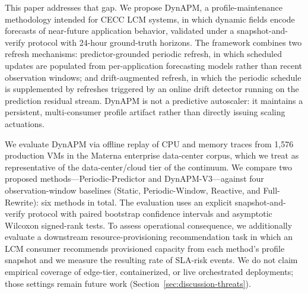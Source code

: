 \documentclass[manuscript,screen,review,anonymous]{acmart}
\begin{document}
This paper addresses that gap. We propose DynAPM, a profile-maintenance
methodology intended for CECC LCM systems, in which dynamic fields encode
forecasts of near-future application behavior, validated under a
snapshot-and-verify protocol with 24-hour ground-truth horizons. The
framework combines two refresh mechanisms: predictor-grounded periodic
refresh, in which scheduled updates are populated from per-application
forecasting models rather than recent observation windows; and
drift-augmented refresh, in which the periodic schedule is supplemented
by refreshes triggered by an online drift detector running on the
prediction residual stream. DynAPM is not a predictive autoscaler: it
maintains a persistent, multi-consumer profile artifact rather than
directly issuing scaling actuations.

We evaluate DynAPM via offline replay of CPU and memory traces from
1{,}576 production VMs in the Materna enterprise data-center corpus,
which we treat as representative of the data-center/cloud tier of the
continuum. We compare two proposed methods---Periodic-Predictor and
DynAPM-V3---against four observation-window baselines (Static,
Periodic-Window, Reactive, and Full-Rewrite): six methods in total. The
evaluation uses an explicit snapshot-and-verify protocol with paired
bootstrap confidence intervals and asymptotic Wilcoxon signed-rank tests.
To assess operational consequence, we additionally evaluate a downstream
resource-provisioning recommendation task in which an LCM consumer
recommends provisioned capacity from each method's profile snapshot and
we measure the resulting rate of SLA-risk events. We do not claim
empirical coverage of edge-tier, containerized, or live orchestrated
deployments; those settings remain future work
(Section~\ref{sec:discussion-threats}).
\end{document}
